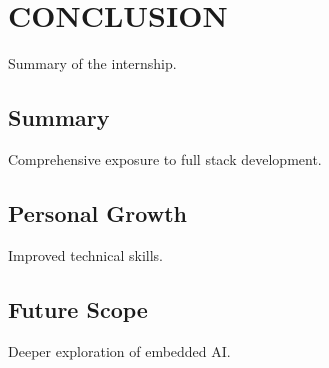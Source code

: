 \documentclass[12pt,a4paper]{report}
\begin{document}
\chapter{CONCLUSION}
\label{ch:conclusion}


Summary of the internship.




\section{Summary}

Comprehensive exposure to full stack development.


\section{Personal Growth}

Improved technical skills.


\section{Future Scope}

Deeper exploration of embedded AI.
\end{document}
